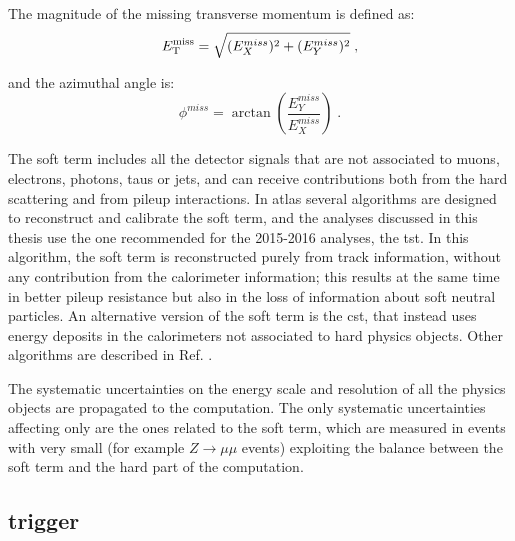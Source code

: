 The magnitude of the missing transverse momentum is defined as:
\begin{equation}
E_{\rm T}^{\mathrm{miss}} = \sqrt{(E_{X}^{miss})^{2}  +  (E_{Y}^{miss})^{2}} \;,
\end{equation}

\noindent and the azimuthal angle is:
\begin{equation}
\phi^{miss} = \arctan \left( \frac{E_Y^{miss}}{E_X^{miss}} \right) \; .
\end{equation}

The soft term includes all the detector signals that are not associated to muons, electrons, photons, taus or jets, and can receive contributions
both from the hard scattering and from pileup interactions. 
In \gls{atlas} several algorithms are designed to reconstruct and calibrate the \met soft term, and the analyses discussed in this thesis use 
the one recommended for the 2015-2016 analyses, the \gls{tst}. In this algorithm, the \met soft term is reconstructed purely from track information, without any contribution from the calorimeter information; 
this results at the same time in better pileup resistance but also in the loss of information about soft neutral particles. 
An alternative version of the soft term is the \gls{cst}, that instead uses energy deposits in the calorimeters not associated to hard physics objects. 
Other algorithms are described in Ref. \cite{Aad:2016nrq}.

The systematic uncertainties on the energy scale and resolution of all the physics objects are propagated to the \met computation.
The only systematic uncertainties affecting only \met are the ones related to the soft term, which are measured in events with very small 
\met (for example $Z \rightarrow \mu \mu$ events) exploiting the balance between the soft term and the hard part of the \met computation.

\subsection{\met trigger}


